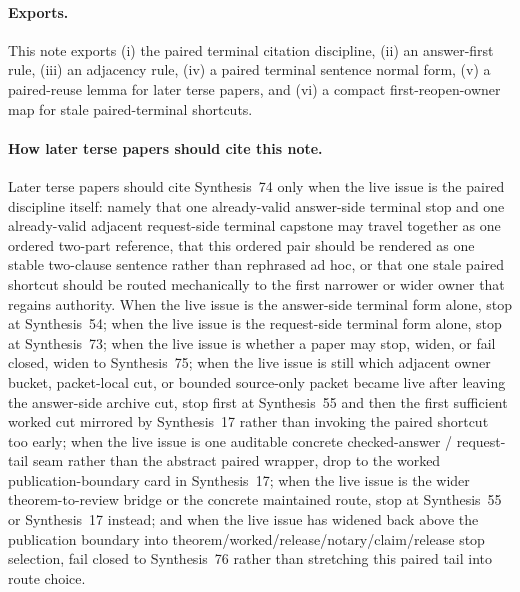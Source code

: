 \documentclass[11pt]{article}
\begin{document}
\paragraph{Exports.}
This note exports (i) the paired terminal citation discipline, (ii) an answer-first rule, (iii) an adjacency rule, (iv) a paired terminal sentence normal form, (v) a paired-reuse lemma for later terse papers, and (vi) a compact first-reopen-owner map for stale paired-terminal shortcuts.

\paragraph{How later terse papers should cite this note.}
Later terse papers should cite Synthesis~74 only when the live issue is the paired discipline itself: namely that one already-valid answer-side terminal stop and one already-valid adjacent request-side terminal capstone may travel together as one ordered two-part reference, that this ordered pair should be rendered as one stable two-clause sentence rather than rephrased ad hoc, or that one stale paired shortcut should be routed mechanically to the first narrower or wider owner that regains authority. When the live issue is the answer-side terminal form alone, stop at Synthesis~54; when the live issue is the request-side terminal form alone, stop at Synthesis~73; when the live issue is whether a paper may stop, widen, or fail closed, widen to Synthesis~75; when the live issue is still which adjacent owner bucket, packet-local cut, or bounded source-only packet became live after leaving the answer-side archive cut, stop first at Synthesis~55 and then the first sufficient worked cut mirrored by Synthesis~17 rather than invoking the paired shortcut too early; when the live issue is one auditable concrete checked-answer / request-tail seam rather than the abstract paired wrapper, drop to the worked publication-boundary card in Synthesis~17; when the live issue is the wider theorem-to-review bridge or the concrete maintained route, stop at Synthesis~55 or Synthesis~17 instead; and when the live issue has widened back above the publication boundary into theorem/worked/release/notary/claim/release stop selection, fail closed to Synthesis~76 rather than stretching this paired tail into route choice.\cite{series:challengeanswerreviewmenus,series:publicrequestresponsepacketrefreshresponsepacketclosureverdicts,series:pairedterminalcutoverrule,series:seriesspines,series:workedexample,series:theoremtopublicationspine}
\end{document}
